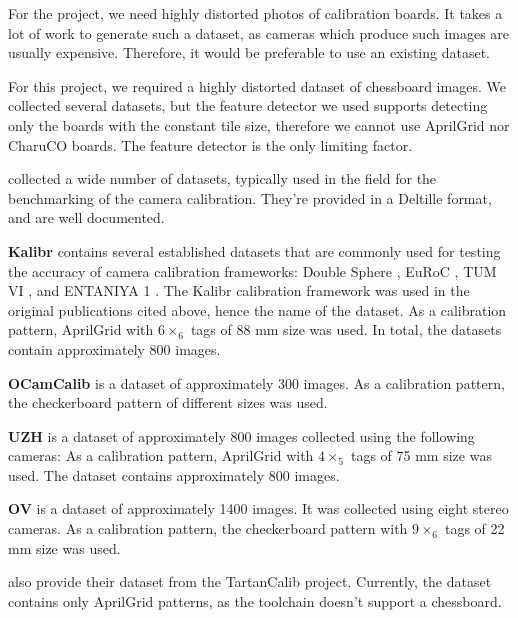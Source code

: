 For the project, we need highly distorted photos of calibration boards. It takes
a lot of work to generate such a dataset, as cameras which produce such images are
usually expensive. Therefore, it would be preferable to use an existing dataset.

For this project, we required a highly distorted dataset of chessboard images.
We collected several datasets, but the feature detector we used supports
detecting only the boards with the constant tile size, therefore we cannot use
AprilGrid nor CharuCO boards. The feature detector is the only limiting factor.

\textcite{lochmanBabelCalibUniversalApproach2021} collected a wide number of
datasets, typically used in the field for the benchmarking of the camera
calibration. They're provided in a Deltille \cite{DeltilleDetector2023} format,
and are well documented.

\textbf{Kalibr} \citep{mayeSelfsupervisedCalibrationRobotic2013} contains several established datasets that are commonly used for testing
the accuracy of camera calibration frameworks: Double Sphere
\cite{usenkoDoubleSphereCamera2018}, EuRoC \cite{burriEuRoCMicroAerial2016}, TUM
VI \cite{schubertTUMVIBenchmark2018}, and ENTANIYA 1
\cite{Calibration250degFisheye}.
The Kalibr calibration framework was used in the
original publications cited above, hence the name of the dataset.
As a calibration pattern, AprilGrid with  \(6\times_6\) tags of 88 mm size was used.
In total, the datasets contain approximately 800 images.

\textbf{OCamCalib} \citep{scaramuzzaFlexibleTechniqueAccurate2006} is a dataset
of approximately 300 images.
As a calibration pattern, the checkerboard pattern of different sizes was used.

\textbf{UZH} \citep{AreWeReady} is a dataset of approximately 800 images
collected using the following cameras:
As a calibration pattern, AprilGrid with \(4\times_5\) tags of 75 mm size was used.
The dataset contains approximately 800 images.

\textbf{OV} \citep{lochmanBabelCalibUniversalApproach2021} is a dataset of
approximately 1400 images. It was collected using eight stereo cameras.
As a calibration pattern, the checkerboard pattern with \(9\times_6\) tags of 22 mm size
was used.

\textcite{duisterhofTartanCalibIterativeWideAngle2022} also provide their
dataset from the TartanCalib project. Currently, the dataset contains only
AprilGrid patterns, as the toolchain doesn't support a chessboard.

